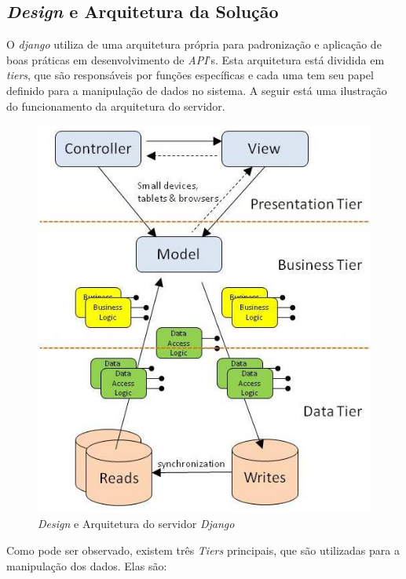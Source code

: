 \subsection{\textit{Design} e Arquitetura da Solução}
\label{sub:design_e_arquitetura_da_soluca_o}

O \textit{django} utiliza de uma arquitetura própria para padronização e aplicação de boas
práticas em desenvolvimento de \textit{API}'s. Esta arquitetura está dividida em \textit{tiers},
que são responsáveis por funções específicas e cada uma tem seu papel definido
para a manipulação de dados no sistema. A seguir está uma ilustração do funcionamento
da arquitetura do servidor.

\begin{figure}
    \begin{center}
        \includegraphics[scale=0.6]{figuras/rest_arch.jpg}
    \end{center}
    \caption{\textit{Design} e Arquitetura do servidor \textit{Django} \cite{serveruml}}
    \label{fig:rest_arch}
\end{figure}

Como pode ser observado, existem três \textit{Tiers} principais, que são utilizadas
para a manipulação dos dados. Elas são:

